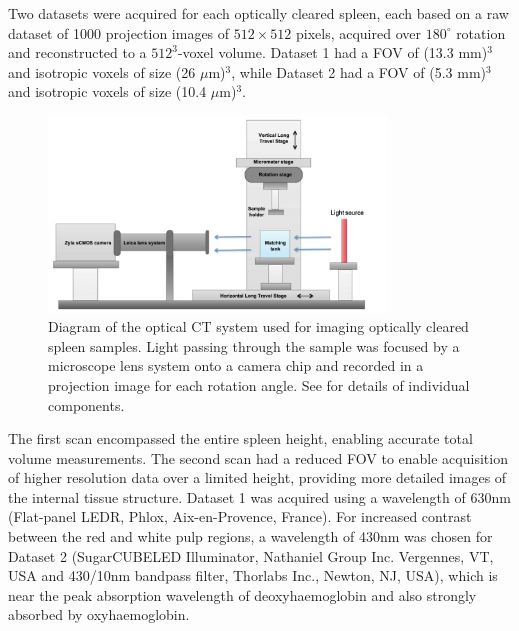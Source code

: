 	Two datasets were acquired for each optically cleared spleen, each based on a raw dataset of 1000 projection images of $512\times 512$ pixels, acquired over $180^{\circ}$ rotation and reconstructed to a $512^3$-voxel volume. Dataset 1 had a FOV of (13.3 mm)$^3$ and isotropic voxels of size (26 $\mu$m)$^3$, while Dataset 2 had a FOV of (5.3 mm)$^3$ and isotropic voxels of size (10.4 $\mu$m)$^3$. 
	
	\begin{figure}%
		\centering
		\includegraphics[width=0.8\textwidth]{spleen_img/spleen_Figure1.jpg}
		\caption{Diagram of the optical CT system used for imaging optically cleared spleen samples. Light passing through the sample was focused by a microscope lens system onto a camera chip and recorded in a projection image for each rotation angle. See \cite{doranestablishing2013} for details of individual components.}
		\label{fig:1}
	\end{figure}
	
	
	The first scan encompassed the entire spleen height, enabling accurate total volume measurements. The second scan had a reduced FOV to enable acquisition of higher resolution data over a limited height, providing more detailed images of the internal tissue structure. Dataset 1 was acquired using a wavelength of 630nm (Flat-panel LEDR, Phlox, Aix-en-Provence, France). For increased contrast between the red and white pulp regions, a wavelength of 430nm was chosen for Dataset 2 (SugarCUBE\texttrademark LED Illuminator, Nathaniel Group Inc. Vergennes, VT, USA and 430/10nm bandpass filter, Thorlabs Inc., Newton, NJ, USA), which is near the peak absorption wavelength of deoxyhaemoglobin and also strongly absorbed by oxyhaemoglobin.
	
	
	
